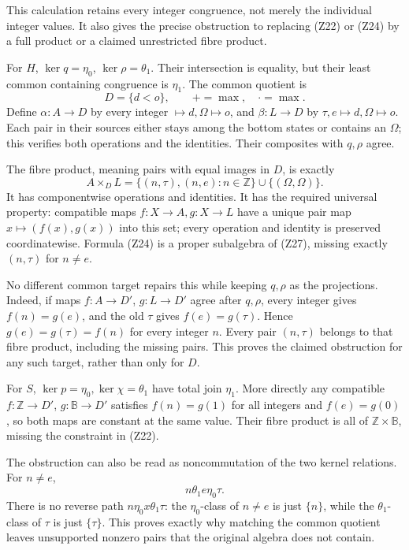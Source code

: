 \documentclass[
]{article}
\begin{document}
This calculation retains every integer congruence, not merely the
individual integer values. It also gives the precise obstruction to
replacing (Z22) or (Z24) by a full product or a claimed unrestricted
fibre product.

For \(H\), \(\ker q=\eta_0\), \(\ker\rho=\theta_1\). Their intersection
is equality, but their least common containing congruence is \(\eta_1\).
The common quotient is \[
D=\{d<o\},\qquad +=\max,\quad\cdot=\max.
\] Define \(\alpha:A\to D\) by every integer
\(\mapsto d,\Omega\mapsto o\), and \(\beta:L\to D\) by
\(\tau,e\mapsto d,\Omega\mapsto o\). Each pair in their sources either
stays among the bottom states or contains an \(\Omega\); this verifies
both operations and the identities. Their composites with \(q,\rho\)
agree.

The fibre product, meaning pairs with equal images in \(D\), is exactly
\[
A\times_D L
=\{(n,\tau),(n,e):n\in\mathbb Z\}\cup\{(\Omega,\Omega)\}.
\tag{Z27}
\] It has componentwise operations and identities. It has the required
universal property: compatible maps \(f:X\to A,g:X\to L\) have a unique
pair map \(x\mapsto(f(x),g(x))\) into this set; every operation and
identity is preserved coordinatewise. Formula (Z24) is a proper
subalgebra of (Z27), missing exactly \((n,\tau)\) for \(n\ne e\).

No different common target repairs this while keeping \(q,\rho\) as the
projections. Indeed, if maps \(f:A\to D'\), \(g:L\to D'\) agree after
\(q,\rho\), every integer gives \(f(n)=g(e)\), and the old \(\tau\)
gives \(f(e)=g(\tau)\). Hence \(g(e)=g(\tau)=f(n)\) for every integer
\(n\). Every pair \((n,\tau)\) belongs to that fibre product, including
the missing pairs. This proves the claimed obstruction for any such
target, rather than only for \(D\).

For \(S\), \(\ker p=\eta_0,\ker\chi=\theta_1\) have total join
\(\eta_1\). More directly any compatible \(f:\mathbb Z\to D'\),
\(g:\mathbb B\to D'\) satisfies \(f(n)=g(1)\) for all integers and
\(f(e)=g(0)\), so both maps are constant at the same value. Their fibre
product is all of \(\mathbb Z\times\mathbb B\), missing the constraint
in (Z22).

The obstruction can also be read as noncommutation of the two kernel
relations. For \(n\ne e\), \[
n\mathrel{\theta_1}e\mathrel{\eta_0}\tau.
\] There is no reverse path
\(n\mathrel{\eta_0}x\mathrel{\theta_1}\tau\): the \(\eta_0\)-class of
\(n\ne e\) is just \(\{n\}\), while the \(\theta_1\)-class of \(\tau\)
is just \(\{\tau\}\). This proves exactly why matching the common
quotient leaves unsupported nonzero pairs that the original algebra does
not contain.
\end{document}
